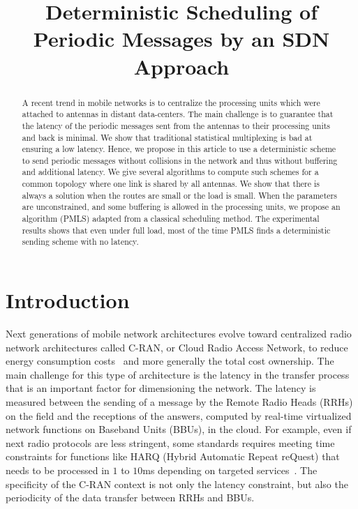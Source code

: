 \documentclass[10pt, conference, letterpaper]{IEEEtran}
\title{Deterministic Scheduling of Periodic Messages by an SDN Approach}
\author{}
\begin{document}
\maketitle

\begin{abstract}
A recent trend in mobile networks is to centralize the processing units which were attached to 
antennas in distant data-centers. The main challenge is to guarantee that the latency of the periodic messages 
sent from the antennas to their processing units and back is minimal. We show that traditional statistical multiplexing
is bad at ensuring a low latency. Hence, we propose in this article to use a deterministic scheme to send periodic messages without collisions in the network and thus without buffering and additional latency. 
We give several algorithms to compute such schemes for a common topology where one link is shared by all antennas.
We show that there is always a solution when the routes are small or the load is small. When the parameters are unconstrained,
and some buffering is allowed in the processing units, we propose an algorithm (PMLS) adapted from a classical scheduling method.
The experimental results shows that even under full load, most of the time PMLS finds a deterministic sending scheme with no latency.
\end{abstract}


\section{Introduction}

Next generations of mobile network architectures evolve toward centralized radio network architectures called C-RAN, or Cloud Radio Access Network, to reduce energy consumption costs~\cite{mobile2011c} and more generally the total cost ownership. The main challenge for this type of architecture is the latency in the transfer process that is an important factor for dimensioning the network. The latency is measured between the sending of a message by the Remote Radio Heads (RRHs) on the field and the receptions of the answers, computed by real-time virtualized network functions on Baseband Units (BBUs), in the cloud. For example, even if next radio protocols are less stringent, some standards requires meeting time constraints for functions like HARQ (Hybrid Automatic Repeat reQuest) that needs to be processed in $1$ to $10$ms depending on targeted services~\cite{bouguen2012lte}. The specificity of the C-RAN context is not only the latency constraint, but also the periodicity of the data transfer between RRHs and BBUs.
\end{document}
